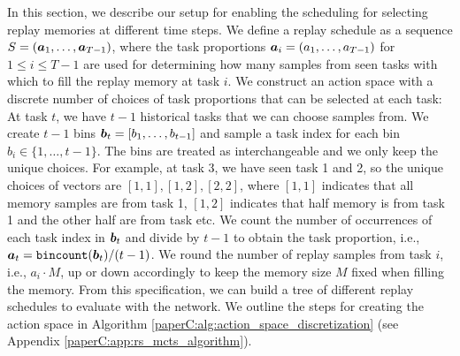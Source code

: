 In this section, we describe our setup for enabling the scheduling for selecting replay memories at different time steps. We define a replay schedule as a sequence $S = ({\bm{a}}_1, \dots, {\bm{a}}_{T-1})$, where the task proportions ${\bm{a}}_i = (a_1, \dots, a_{T-1})$ for $1 \leq i \leq T-1$ are used for determining how many samples from seen tasks with which to fill the replay memory at task $i$. We construct an action space with a discrete number of choices of task proportions that can be selected at each task: At task $t$, we have $t-1$ historical tasks that we can choose samples from. We create $t-1$ bins ${\bm{b}}_t = [b_1, \dots, b_{t-1}]$ and sample a task index for each bin $b_i \in \{1, \dots, t-1\}$. The bins are treated as interchangeable and we only keep the unique choices. For example, at task 3, we have seen task 1 and 2, so the unique choices of vectors are $[1,1], [1,2], [2,2]$, where $[1,1]$ indicates that all memory samples are from task 1, $[1,2]$ indicates that half memory is from task 1 and the other half are from task etc. We count the number of occurrences of each task index in ${\bm{b}}_t$ and divide by $t-1$ to obtain the task proportion, i.e., ${\bm{a}}_t = \texttt{bincount}({\bm{b}}_t) / (t-1)$. We round the number of replay samples from task $i$, i.e., $a_i \cdot M$, up or down accordingly to keep the memory size $M$ fixed when filling the memory. From this specification, we can build a tree of different replay schedules to evaluate with the network. We outline the steps for creating the action space in Algorithm \ref{paperC:alg:action_space_discretization} (see Appendix \ref{paperC:app:rs_mcts_algorithm}). 


